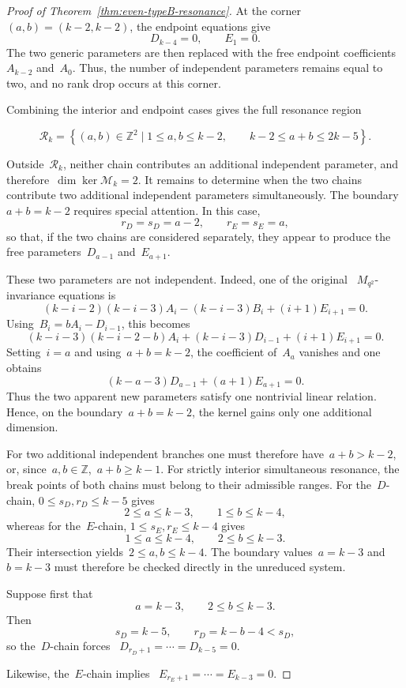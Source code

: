 \documentclass[12pt,a4paper]{amsart}
\theoremstyle{thm}
\theoremstyle{definition}
\begin{document}
\begin{proof}[Proof of Theorem~\textup{\ref{thm:even-typeB-resonance}}]
At the corner~$(a,b)=(k-2,k-2)$,
the endpoint equations give
\[
D_{k-4}=0,
\qquad
E_1=0.
\]
The two generic parameters are then replaced with the free endpoint
coefficients~\(A_{k-2}\) and~\(A_0\). Thus, the number of independent
parameters remains equal to two, and no rank drop occurs at this
corner.

Combining the interior and endpoint cases gives the full resonance
region

\[
\mathcal R_k
=
\left\{
(a,b)\in\mathbb Z^2\mid
1\leq a,b\leq k-2,\qquad
k-2\leq a+b\leq2k-5
\right\}.
\]

Outside~\(\mathcal R_k\), neither chain contributes an additional
independent parameter, and therefore~$\dim\ker\mathcal M_k=2$.
It remains to determine when the two chains contribute two additional
independent parameters simultaneously. The boundary~$a+b=k-2$
requires special attention. In this case,
\[
r_D=s_D=a-2,
\qquad
r_E=s_E=a,
\]
so that, if the two chains are considered separately, they appear to
produce the free parameters~\(D_{a-1}\) and~\(E_{a+1}\).

These two parameters are not independent. Indeed, one of the original~%
\(M_{q^2}\)-invariance equations is
\[
(k-i-2)(k-i-3)A_i
-
(k-i-3)B_i
+
(i+1)E_{i+1}=0.
\]
Using~$B_i=bA_i-D_{i-1}$,
this becomes
\[
(k-i-3)(k-i-2-b)A_i
+
(k-i-3)D_{i-1}
+
(i+1)E_{i+1}=0.
\]
Setting~\(i=a\) and using~\(a+b=k-2\), the coefficient of~\(A_a\)
vanishes and one obtains
\[
(k-a-3)D_{a-1}
+
(a+1)E_{a+1}=0.
\]
Thus the two apparent new parameters satisfy one nontrivial linear
relation. Hence, on the boundary~\(a+b=k-2\), the kernel gains only one
additional dimension.

For two additional independent branches one must therefore have~$a+b>k-2$,
or, since~\(a,b\in\mathbb Z\),~$a+b\geq k-1$.
For strictly interior simultaneous resonance, the break points of both
chains must belong to their admissible ranges. For the~\(D\)-chain,
 $0\leq s_D,r_D\leq k-5$
gives
\[
2\leq a\leq k-3,
\qquad
1\leq b\leq k-4,
\]
whereas for the~\(E\)-chain, $1\leq s_E,r_E\leq k-4$
gives
\[
1\leq a\leq k-4,
\qquad
2\leq b\leq k-3.
\]
Their intersection yields~$2\leq a,b\leq k-4$.
The boundary values~\(a=k-3\) and~\(b=k-3\) must therefore be checked
directly in the unreduced system.

Suppose first that
\[
a=k-3,
\qquad
2\leq b\leq k-3.
\]
Then
\[
s_D=k-5,
\qquad
r_D=k-b-4<s_D,
\]
so the~\(D\)-chain forces~%
$D_{r_D+1}=\cdots=D_{k-5}=0$.

Likewise, the~\(E\)-chain implies~%
$E_{r_E+1}=\cdots=E_{k-3}=0$.


\end{proof}
\end{document}
